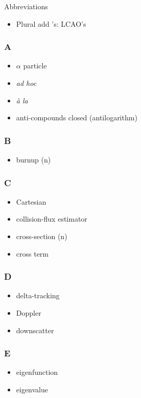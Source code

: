 \documentclass[10pt, letter]{article}
\begin{document}
\begin{multicols}{2}
Abbreviations
\begin{itemize}
\item Plural add 's: LCAO's
\end{itemize}

\pagebreak
\subsubsection*{A}
\begin{itemize}
\item $\alpha$ particle
\item \textit{ad hoc}
\item \textit{\`{a} la}
\item anti-compounds closed (antilogarithm)
\end{itemize}

\subsubsection*{B}
\begin{itemize}
\item burnup (n)
\end{itemize}


\subsubsection*{C}
\begin{itemize}
\item Cartesian
\item collision-flux estimator
\item cross-section (n)
\item cross term
\end{itemize}

\subsubsection*{D}
\begin{itemize}
\item delta-tracking
\item Doppler
\item downscatter
\end{itemize}


\subsubsection*{E}
\begin{itemize}
\item eigenfunction
\item eigenvalue
\end{itemize}

\end{multicols}
\end{document}
